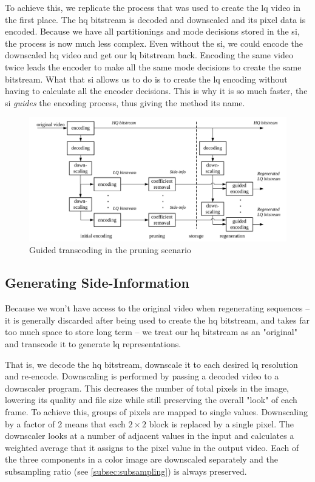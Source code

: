 To achieve this, we replicate the process that was used to create the \gls{lq} video in the first place. The \gls{hq} bitstream is decoded and downscaled and its pixel data is encoded. Because we have all partitionings and mode decisions stored in the \gls{si}, the process is now much less complex. Even without the \gls{si}, we could encode the downscaled \gls{hq} video and get our \gls{lq} bitstream back. Encoding the same video twice leads the encoder to make all the same mode decisions to create the same bitstream. What that \gls{si} allows us to do is to create the \gls{lq} encoding without having to calculate all the encoder decisions. This is why it is so much faster, the \gls{si} \textit{guides} the encoding process, thus giving the method its name.

\begin{figure}
    \centering
    \includegraphics[scale=0.8]{pictures/visio/pruning}
    \caption{Guided transcoding in the pruning scenario}
    \label{fig:gt-pruning}
\end{figure}


\subsection{Generating Side-Information}

Because we won't have access to the original video when regenerating sequences -- it is generally discarded after being used to create the \gls{hq} bitstream, and takes far too much space to store long term -- we treat our \gls{hq} bitstream as an "original" and transcode it to generate \gls{lq} representations.

That is, we decode the \gls{hq} bitstream, downscale it to each desired \gls{lq} resolution and re-encode. Downscaling is performed by passing a decoded video to a downscaler program. This decreases the number of total pixels in the image, lowering its quality and file size while still preserving the overall "look" of each frame. To achieve this, groups of pixels are mapped to single values. Downscaling by a factor of 2 means that each $2 \times 2$ block is replaced by a single pixel. The downscaler looks at a number of adjacent values in the input and calculates a weighted average that it assigns to the pixel value in the output video. Each of the three components in a color image are downscaled separately and the subsampling ratio (see \cref{subsec:subsampling}) is always preserved.

